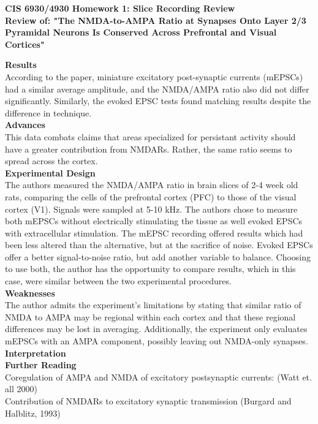 \documentclass[11pt]{article}
\begin{document}
\begin{center}
{\large {\bf CIS 6930/4930 Homework 1: Slice Recording Review}}\\
{\normalsize {\bf Review of: "The NMDA-to-AMPA Ratio at Synapses Onto Layer 2/3 Pyramidal Neurons
Is Conserved Across Prefrontal and Visual Cortices"}}
\end{center}

\textbf{Results} \\
According to the paper, miniature excitatory post-synaptic currents (mEPSCs) had
a similar average amplitude, and the NMDA/AMPA ratio also did not differ significantly.
Similarly, the evoked EPSC tests found matching results despite the difference in
technique. \\

\textbf{Advances} \\
This data combats claims that areas specialized for persistant activity should have
a greater contribution from NMDARs.  Rather, the same ratio seems to spread across
the cortex. \\

\textbf{Experimental Design} \\
The authors measured the NMDA/AMPA ratio in brain slices of 2-4 week old rats, comparing
the cells of the prefrontal cortex (PFC) to those of the visual cortex (V1).  Signals
were sampled at 5-10 kHz.  The authors chose to measure both mEPSCs without electrically
stimulating the tissue as well evoked EPSCs with extracellular stimulation.  The mEPSC
recording offered results which had been less altered than the alternative, but at
the sacrifice of noise.  Evoked EPSCs offer a better signal-to-noise ratio, but add
another variable to balance.  Choosing to use both, the author has the opportunity
to compare results, which in this case, were similar between the two experimental
procedures. \\

\textbf{Weaknesses} \\
The author admits the experiment's limitations by stating that similar ratio of NMDA
to AMPA may be regional within each cortex and that these regional differences may
be lost in averaging.  Additionally, the experiment only evaluates mEPSCs with an
AMPA component, possibly leaving out NMDA-only synapses.  \\

\textbf{Interpretation} \\

\textbf{Further Reading} \\
Coregulation of AMPA and NMDA of excitatory postsynaptic currents: (Watt et. all 2000) \\
Contribution of NMDARs to excitatory synaptic transmission (Burgard and Halblitz, 1993) \\
\end{document}
